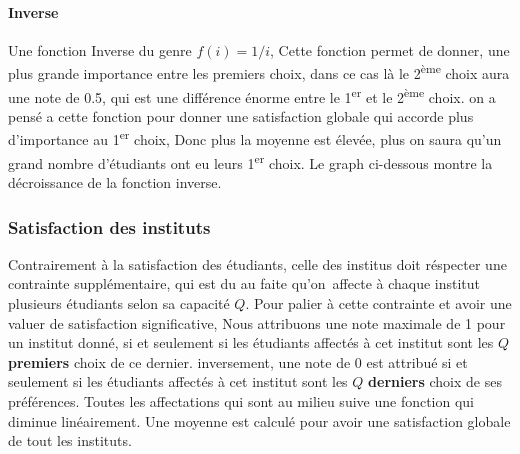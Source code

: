 \documentclass[12pt,titlepage]{article}
\begin{document}
\begin{figure}
  
\end{figure}

\paragraph{Inverse} Une fonction Inverse du genre $f(i) = 1/i$, Cette fonction permet de donner, une plus grande importance entre les premiers choix, dans ce cas là le 2\textsuperscript{ème} choix aura une note de 0.5, qui est une différence énorme entre le 1\textsuperscript{er} et le 2\textsuperscript{ème} choix. on a pensé a cette fonction pour donner une satisfaction globale qui accorde plus d'importance au 1\textsuperscript{er} choix, Donc plus la moyenne est élevée, plus on saura qu'un grand nombre d'étudiants ont eu leurs 1\textsuperscript{er} choix. Le graph ci-dessous montre la décroissance de la fonction inverse. 

\begin{figure}
  
\end{figure}



\subsubsection*{Satisfaction des instituts}
Contrairement à la satisfaction des étudiants, celle des institus doit réspecter une contrainte supplémentaire, qui est du au faite qu'on affecte à chaque institut plusieurs étudiants selon sa capacité $Q$. Pour palier à cette contrainte et avoir une valuer de satisfaction significative, Nous attribuons une note maximale de 1 pour un institut donné, si et seulement si les étudiants affectés à cet institut sont les $Q$ \textbf{premiers} choix de ce dernier. inversement, une note de 0 est attribué si et seulement si les étudiants affectés à cet institut sont les $Q$ \textbf{derniers} choix de ses préférences. Toutes les affectations qui sont au milieu suive une fonction qui diminue linéairement. Une moyenne est calculé pour avoir une satisfaction globale de tout les instituts.


\begin{figure}
  
\end{figure}
\end{document}
